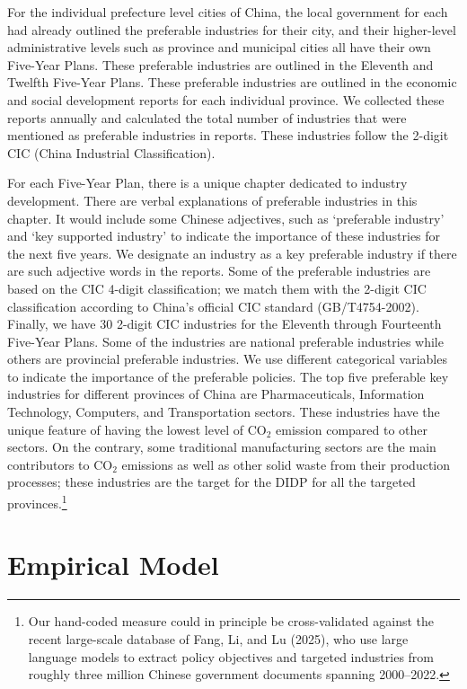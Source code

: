 \documentclass[11pt,a4paper]{article}
\begin{document}
For the individual prefecture level cities of China, the local government for each had already outlined the preferable industries for their city, and their higher-level administrative levels such as province and municipal cities all have their own Five-Year Plans. These preferable industries are outlined in the Eleventh and Twelfth Five-Year Plans. These preferable industries are outlined in the economic and social development reports for each individual province. We collected these reports annually and calculated the total number of industries that were mentioned as preferable industries in reports. These industries follow the 2-digit CIC (China Industrial Classification).

For each Five-Year Plan, there is a unique chapter dedicated to industry development. There are verbal explanations of preferable industries in this chapter. It would include some Chinese adjectives, such as `preferable industry' and `key supported industry' to indicate the importance of these industries for the next five years. We designate an industry as a key preferable industry if there are such adjective words in the reports. Some of the preferable industries are based on the CIC 4-digit classification; we match them with the 2-digit CIC classification according to China's official CIC standard (GB/T4754-2002). Finally, we have 30 2-digit CIC industries for the Eleventh through Fourteenth Five-Year Plans. Some of the industries are national preferable industries while others are provincial preferable industries. We use different categorical variables to indicate the importance of the preferable policies. The top five preferable key industries for different provinces of China are Pharmaceuticals, Information Technology, Computers, and Transportation sectors. These industries have the unique feature of having the lowest level of CO$_2$ emission compared to other sectors. On the contrary, some traditional manufacturing sectors are the main contributors to CO$_2$ emissions as well as other solid waste from their production processes; these industries are the target for the DIDP for all the targeted provinces.\footnote{Our hand-coded measure could in principle be cross-validated against the recent large-scale database of Fang, Li, and Lu (2025), who use large language models to extract policy objectives and targeted industries from roughly three million Chinese government documents spanning 2000--2022.}

\section{Empirical Model}
\end{document}
